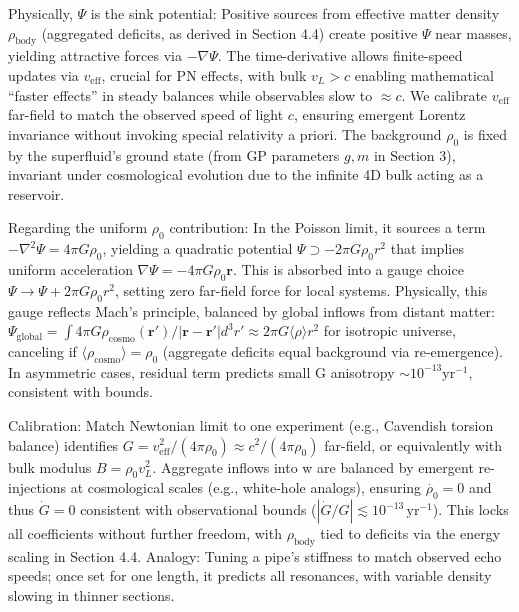 \documentclass{article}
\begin{document}
Physically, $\Psi$ is the sink potential: Positive sources from effective matter density $\rho_{\text{body}}$ (aggregated deficits, as derived in Section 4.4) create positive $\Psi$ near masses, yielding attractive forces via $-\nabla \Psi$. The time-derivative allows finite-speed updates via $v_{\text{eff}}$, crucial for PN effects, with bulk $v_L > c$ enabling mathematical ``faster effects'' in steady balances while observables slow to $\approx c$. We calibrate $v_{\text{eff}}$ far-field to match the observed speed of light $c$, ensuring emergent Lorentz invariance without invoking special relativity a priori. The background $\rho_0$ is fixed by the superfluid's ground state (from GP parameters $g, m$ in Section 3), invariant under cosmological evolution due to the infinite 4D bulk acting as a reservoir.

Regarding the uniform $\rho_0$ contribution: In the Poisson limit, it sources a term $-\nabla^2 \Psi = 4\pi G \rho_0$, yielding a quadratic potential $\Psi \supset -2\pi G \rho_0 r^2$ that implies uniform acceleration $\nabla \Psi = -4\pi G \rho_0 \mathbf{r}$. This is absorbed into a gauge choice $\Psi \to \Psi + 2\pi G \rho_0 r^2$, setting zero far-field force for local systems. Physically, this gauge reflects Mach's principle, balanced by global inflows from distant matter: $\Psi_{\text{global}} = \int 4\pi G \rho_{\text{cosmo}}(\mathbf{r}') / |\mathbf{r} - \mathbf{r}'| d^3 r' \approx 2\pi G \langle \rho \rangle r^2$ for isotropic universe, canceling if $\langle \rho_{\text{cosmo}} \rangle = \rho_0$ (aggregate deficits equal background via re-emergence). In asymmetric cases, residual term predicts small G anisotropy $\sim 10^{-13} \mathrm{yr}^{-1}$, consistent with bounds.

Calibration: Match Newtonian limit to one experiment (e.g., Cavendish torsion balance) identifies $G = v_{\text{eff}}^2 / (4\pi \rho_0) \approx c^2 / (4\pi \rho_0)$ far-field, or equivalently with bulk modulus $B = \rho_0 v_L^2$. Aggregate inflows into w are balanced by emergent re-injections at cosmological scales (e.g., white-hole analogs), ensuring $\dot{\rho_0} = 0$ and thus $\dot{G} = 0$ consistent with observational bounds ($ |\dot{G}/G| \lesssim 10^{-13} \, \mathrm{yr}^{-1} $). This locks all coefficients without further freedom, with $\rho_{\text{body}}$ tied to deficits via the energy scaling in Section 4.4. Analogy: Tuning a pipe's stiffness to match observed echo speeds; once set for one length, it predicts all resonances, with variable density slowing in thinner sections.
\end{document}

